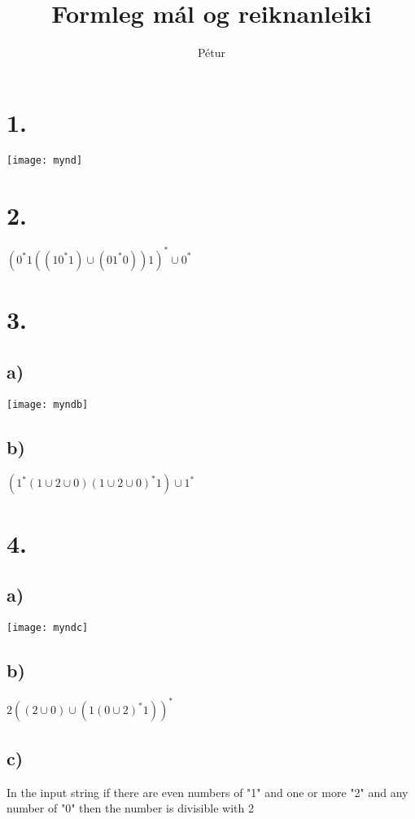 \documentclass[]{article}
\begin{document}
\title{Formleg mál og reiknanleiki}
\author{Pétur}
\maketitle

\section*{1.}

\texttt{[image: mynd]}

\section*{2.}

$(0^{*}1((10^{*}1)\cup(01^{*}0))1)^{*}\cup0^{*}$

\section*{3.}

\subsection*{a)}

\texttt{[image: myndb]}

\subsection*{b)}

$(1^{*} (1 \cup 2 \cup 0 ) (1 \cup 2 \cup 0 )^{*}1)\cup 1^{*}$

\section*{4.}

\subsection*{a)}

\texttt{[image: myndc]}

\subsection*{b)}

$2((2 \cup 0) \cup (1(0 \cup 2)^{*} 1))^{*}$

\subsection*{c)}

In the input string if there are even numbers of "1" and one or more "2" and any number of "0" then the number is divisible with 2
\end{document}
